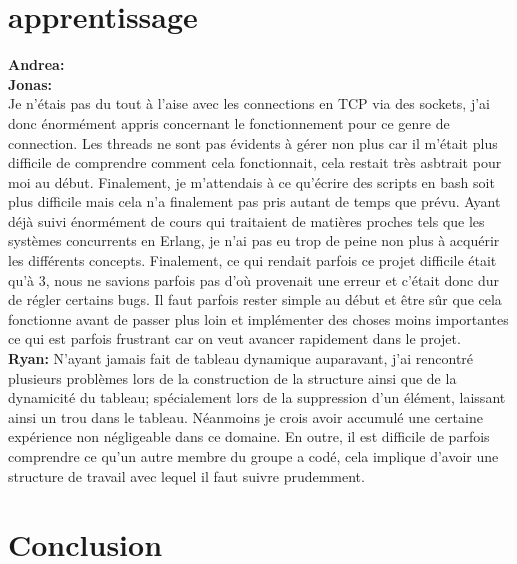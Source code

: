 \documentclass[11pt,a4paper]{article}
\begin{document}
\section{apprentissage}
\textbf{Andrea:}\\

\textbf{Jonas:}\\
Je n'étais pas du tout à l'aise avec les connections en TCP via des sockets, j'ai donc énormément appris concernant le fonctionnement pour ce genre de connection. Les threads ne sont pas évidents à gérer non plus car il m'était plus difficile de comprendre comment cela fonctionnait, cela restait très asbtrait pour moi au début. Finalement, je m'attendais à ce qu'écrire des scripts en bash soit plus difficile mais cela n'a finalement pas pris autant de temps que prévu. Ayant déjà suivi énormément de cours qui traitaient de matières proches tels que les systèmes concurrents en Erlang, je n'ai pas eu trop de peine non plus à acquérir les différents concepts. Finalement, ce qui rendait parfois ce projet difficile était qu'à 3, nous ne savions parfois pas d'où provenait une erreur et c'était donc dur de régler certains bugs. Il faut parfois rester simple au début et être sûr que cela fonctionne avant de passer plus loin et implémenter des choses moins importantes ce qui est parfois frustrant car on veut avancer rapidement dans le projet.\\
\textbf{Ryan:} N'ayant jamais fait de tableau dynamique auparavant, j'ai rencontré plusieurs problèmes lors de la construction de la structure ainsi que de la dynamicité du tableau; spécialement lors de la suppression d'un élément, laissant ainsi un trou dans le tableau. Néanmoins je crois avoir accumulé une certaine expérience non négligeable dans ce domaine. En outre, il est difficile de parfois comprendre ce qu'un autre membre du groupe a codé, cela implique d'avoir une structure de travail avec lequel il faut suivre prudemment.  

\section{Conclusion}


\end{document}
